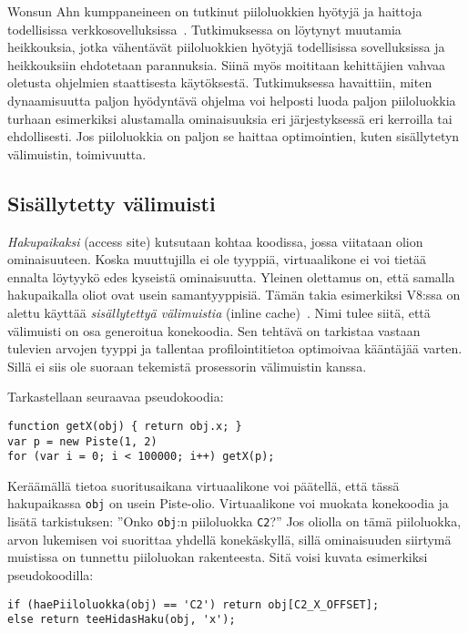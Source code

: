 Wonsun Ahn kumppaneineen on tutkinut piiloluokkien hyötyjä ja haittoja todellisissa verkkosovelluksissa~\cite{Ahn2014}. Tutkimuksessa on löytynyt muutamia heikkouksia, jotka vähentävät piiloluokkien hyötyjä todellisissa sovelluksissa ja heikkouksiin ehdotetaan parannuksia. Siinä myös moititaan kehittäjien vahvaa oletusta ohjelmien staattisesta käytöksestä. Tutkimuksessa havaittiin, miten dynaamisuutta paljon hyödyntävä ohjelma voi helposti luoda paljon piiloluokkia turhaan esimerkiksi alustamalla ominaisuuksia eri järjestyksessä eri kerroilla tai ehdollisesti. Jos piiloluokkia on paljon se haittaa optimointien, kuten sisällytetyn välimuistin, toimivuutta.


\subsection{Sisällytetty välimuisti}

\textit{Hakupaikaksi} (access site) kutsutaan kohtaa koodissa, jossa viitataan olion ominaisuuteen. Koska muuttujilla ei ole tyyppiä, virtuaalikone ei voi tietää ennalta löytyykö edes kyseistä ominaisuutta. Yleinen olettamus on, että samalla hakupaikalla oliot ovat usein samantyyppisiä. Tämän takia esimerkiksi V8:ssa on alettu käyttää \textit{sisällytettyä välimuistia} (inline cache)~\cite[s.~498]{Ahn2014}. Nimi tulee siitä, että välimuisti on osa generoitua konekoodia. Sen tehtävä on tarkistaa vastaan tulevien arvojen tyyppi ja tallentaa profilointitietoa optimoivaa kääntäjää varten. Sillä ei siis ole suoraan tekemistä prosessorin välimuistin kanssa.

Tarkastellaan seuraavaa pseudokoodia:
\begin{lstlisting}
function getX(obj) { return obj.x; }
var p = new Piste(1, 2)
for (var i = 0; i < 100000; i++) getX(p);
\end{lstlisting}
Keräämällä tietoa suoritusaikana virtuaalikone voi päätellä, että tässä hakupaikassa \texttt{obj} on usein Piste-olio. Virtuaalikone voi muokata konekoodia ja lisätä tarkistuksen: ''Onko \texttt{obj}:n piiloluokka \texttt{C2}?'' Jos oliolla on tämä piiloluokka, arvon lukemisen voi suorittaa yhdellä konekäskyllä, sillä ominaisuuden siirtymä muistissa on tunnettu piiloluokan rakenteesta. Sitä voisi kuvata esimerkiksi pseudokoodilla:
\begin{lstlisting}
if (haePiiloluokka(obj) == 'C2') return obj[C2_X_OFFSET];
else return teeHidasHaku(obj, 'x');
\end{lstlisting}

